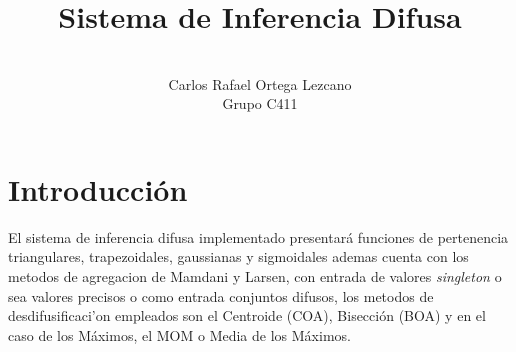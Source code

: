 \documentclass[a4paper,10pt,twocolumn]{article}
\title{Sistema de Inferencia Difusa}
\author{\\
	\name Carlos Rafael Ortega Lezcano \\ \addr Grupo C411 }
\begin{document}



\section*{Introducci\'on}\label{sec:intro}

El sistema de inferencia difusa implementado presentar\'a funciones de pertenencia triangulares, trapezoidales, gaussianas y sigmoidales ademas cuenta con los metodos de agregacion de Mamdani y Larsen, con entrada de valores \textit{singleton} o sea valores precisos o como entrada conjuntos difusos, los metodos de desdifusificaci'on empleados son el Centroide (COA), Bisecci\'on (BOA) y en el caso de los M\'aximos, el MOM o Media de los M\'aximos.
\end{document}

